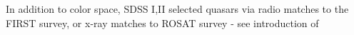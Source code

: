 \documentclass[modern]{aastex62}
\begin{document}
In addition to color space, SDSS I,II selected quasars via radio matches to the FIRST survey, or x-ray matches to ROSAT survey  - see introduction of \citep{myers2015}


%


\end{document}
